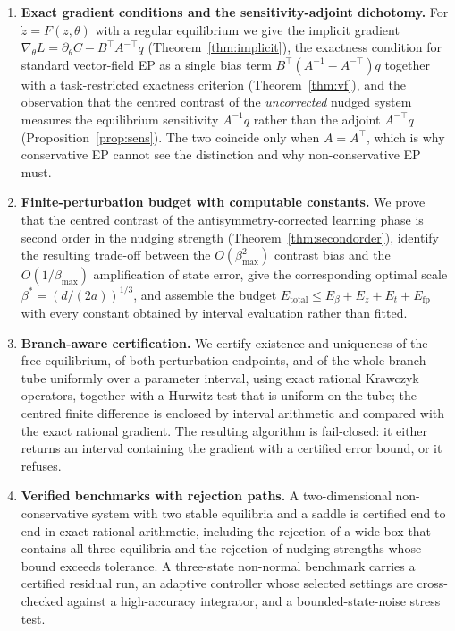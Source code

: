 \documentclass[11pt]{article}
\theoremstyle{definition}
\theoremstyle{remark}
\newcommand{\grad}{\nabla}
\newcommand{\betamax}{\beta_{\max}}
\begin{document}
\begin{enumerate}
\item \textbf{Exact gradient conditions and the sensitivity-adjoint dichotomy.} For
$\dot z = F(z,\theta)$ with a regular equilibrium we give the implicit gradient
$\grad_\theta L = \partial_\theta C - B^{\top}A^{-\top}q$ (Theorem~\ref{thm:implicit}), the
exactness condition for standard vector-field EP as a single bias term
$B^{\top}(A^{-1}-A^{-\top})q$ together with a task-restricted exactness criterion
(Theorem~\ref{thm:vf}), and the observation that the centred contrast of the \emph{uncorrected}
nudged system measures the equilibrium sensitivity $A^{-1}q$ rather than the adjoint
$A^{-\top}q$ (Proposition~\ref{prop:sens}). The two coincide only when $A = A^{\top}$, which is
why conservative EP cannot see the distinction and why non-conservative EP must.
\item \textbf{Finite-perturbation budget with computable constants.} We prove that the centred
contrast of the antisymmetry-corrected learning phase is second order in the nudging strength
(Theorem~\ref{thm:secondorder}), identify the resulting trade-off between the $O(\betamax^2)$
contrast bias and the $O(1/\betamax)$ amplification of state error, give the corresponding
optimal scale $\beta^\ast = (d/(2a))^{1/3}$, and assemble the budget
$E_{\mathrm{total}} \le E_{\beta} + E_z + E_t + E_{\mathrm{fp}}$ with every constant obtained by
interval evaluation rather than fitted.
\item \textbf{Branch-aware certification.} We certify existence and uniqueness of the free
equilibrium, of both perturbation endpoints, and of the whole branch tube uniformly over a
parameter interval, using exact rational Krawczyk operators, together with a Hurwitz test that is
uniform on the tube; the centred finite difference is enclosed by interval arithmetic and
compared with the exact rational gradient. The resulting algorithm is fail-closed: it either
returns an interval containing the gradient with a certified error bound, or it refuses.
\item \textbf{Verified benchmarks with rejection paths.} A two-dimensional non-conservative
system with two stable equilibria and a saddle is certified end to end in exact rational
arithmetic, including the rejection of a wide box that contains all three equilibria and the
rejection of nudging strengths whose bound exceeds tolerance. A three-state non-normal benchmark
carries a certified residual run, an adaptive controller whose selected settings are cross-checked
against a high-accuracy integrator, and a bounded-state-noise stress test.
\end{enumerate}
\end{document}
